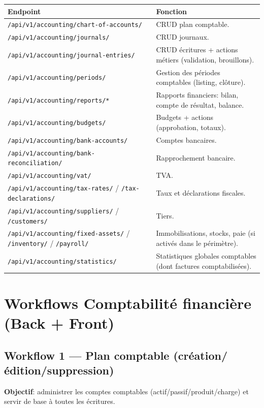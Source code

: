 \documentclass[12pt,a4paper]{article}
\begin{document}
\begin{longtable}{|p{5.2cm}|p{9.2cm}|}
\hline
\textbf{Endpoint} & \textbf{Fonction} \\ \hline
\texttt{/api/v1/accounting/chart-of-accounts/} & CRUD plan comptable. \\ \hline
\texttt{/api/v1/accounting/journals/} & CRUD journaux. \\ \hline
\texttt{/api/v1/accounting/journal-entries/} & CRUD écritures + actions métiers (validation, brouillons). \\ \hline
\texttt{/api/v1/accounting/periods/} & Gestion des périodes comptables (listing, clôture). \\ \hline
\texttt{/api/v1/accounting/reports/*} & Rapports financiers: bilan, compte de résultat, balance. \\ \hline
\texttt{/api/v1/accounting/budgets/} & Budgets + actions (approbation, totaux). \\ \hline
\texttt{/api/v1/accounting/bank-accounts/} & Comptes bancaires. \\ \hline
\texttt{/api/v1/accounting/bank-reconciliation/} & Rapprochement bancaire. \\ \hline
\texttt{/api/v1/accounting/vat/} & TVA. \\ \hline
\texttt{/api/v1/accounting/tax-rates/} / \texttt{/tax-declarations/} & Taux et déclarations fiscales. \\ \hline
\texttt{/api/v1/accounting/suppliers/} / \texttt{/customers/} & Tiers. \\ \hline
\texttt{/api/v1/accounting/fixed-assets/} / \texttt{/inventory/} / \texttt{/payroll/} & Immobilisations, stocks, paie (si activés dans le périmètre). \\ \hline
\texttt{/api/v1/accounting/statistics/} & Statistiques globales comptables (dont factures comptabilisées). \\ \hline
\end{longtable}

\section{Workflows Comptabilité financière (Back + Front)}

\subsection{Workflow 1 --- Plan comptable (création/édition/suppression)}
\textbf{Objectif}: administrer les comptes comptables (actif/passif/produit/charge) et servir de base à toutes les écritures.
\end{document}
